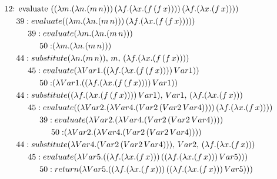 \documentclass{article}
\theoremstyle{theorem}
\theoremstyle{definition}
\theoremstyle{remark}
\begin{document}
\begin{align*}
  &\text{12: evaluate } ((\lambda m.(\lambda n.(m \, n))) \, (\lambda f.(\lambda x.(f \, (f \, x)))) \, (\lambda f.(\lambda x.(f \, x)))) \\
  &\hspace{5mm}{39: evaluate } ((\lambda m.(\lambda n.(m \, n))) \, (\lambda f.(\lambda x.(f \, (f \, x))))) \\
  &\hspace{10mm}{39: evaluate } (\lambda m.(\lambda n.(m \, n))) \\
  &\hspace{15mm}{50: } (\lambda m.(\lambda n.(m \, n))) \\
  &\hspace{5mm}{44: substitute } (\lambda n.(m \, n)), \, m, \, (\lambda f.(\lambda x.(f \, (f \, x)))) \\
  &\hspace{10mm}{45: evaluate } (\lambda Var1.((\lambda f.(\lambda x.(f \, (f \, x)))) \, Var1)) \\
  &\hspace{15mm}{50: } (\lambda Var1.((\lambda f.(\lambda x.(f \, (f \, x)))) \, Var1)) \\
  &\hspace{5mm}{44: substitute } ((\lambda f.(\lambda x.(f \, (f \, x)))) \, Var1), \, Var1 , \, (\lambda f.(\lambda x.(f \, x))) \\
  &\hspace{10mm}{45: evaluate } ((\lambda Var2.(\lambda Var4.(Var2 \, (Var2 \, Var4)))) \, (\lambda f.(\lambda x.(f \, x)))) \\
  &\hspace{15mm}{39: evaluate } (\lambda Var2.(\lambda Var4.(Var2 \, (Var2 \, Var4)))) \\
  &\hspace{20mm}{50: } (\lambda Var2.(\lambda Var4.(Var2 \, (Var2 \, Var4)))) \\
  &\hspace{5mm}{44: substitute } (\lambda Var4.(Var2 \, (Var2 \, Var4))), \, Var2, \, (\lambda f.(\lambda x.(f \, x))) \\
  &\hspace{10mm}{45: evaluate } (\lambda Var5.((\lambda f.(\lambda x.(f \, x))) \, ((\lambda f.(\lambda x.(f \, x))) \, Var5))) \\
  &\hspace{15mm}{50: return } (\lambda Var5.((\lambda f.(\lambda x.(f \, x))) \, ((\lambda f.(\lambda x.(f \, x))) \, Var5))) \\
\end{align*}
\end{document}
